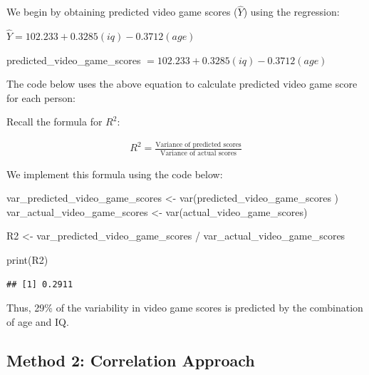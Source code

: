 \documentclass[
]{krantz}
\makeatletter
\newenvironment{Shaded}{\begin{snugshade}}{\end{snugshade}}
\newcommand{\FunctionTok}[1]{\textcolor[rgb]{0,0,0}{#1}}
\newcommand{\NormalTok}[1]{#1}
\newcommand{\OtherTok}[1]{\textcolor[rgb]{0.37,0.37,0.37}{#1}}
\newcommand{\SpecialCharTok}[1]{\textcolor[rgb]{0,0,0}{#1}}
\newenvironment{kframe}{%
\medskip{}
\setlength{\fboxsep}{.8em}
 \def\at@end@of@kframe{}%
 \ifinner\ifhmode%
  \def\at@end@of@kframe{\end{minipage}}%
  \begin{minipage}{\columnwidth}%
 \fi\fi%
 \def\FrameCommand##1{\hskip\@totalleftmargin \hskip-\fboxsep
 \colorbox{shadecolor}{##1}\hskip-\fboxsep
     \hskip-\linewidth \hskip-\@totalleftmargin \hskip\columnwidth}%
 \MakeFramed {\advance\hsize-\width
   \@totalleftmargin\z@ \linewidth\hsize
   \@setminipage}}%
 {\par\unskip\endMakeFramed%
 \at@end@of@kframe}
\renewenvironment{Shaded}{\begin{kframe}}{\end{kframe}}
\makeatother
\begin{document}
We begin by obtaining predicted video game scores (\(\widehat{Y}\)) using the regression:

\(\widehat{Y} = 102.233 + 0.3285(iq) - 0.3712(age)\)

predicted\_video\_game\_scores \(= 102.233 + 0.3285(iq) - 0.3712(age)\)

The code below uses the above equation to calculate predicted video game score for each person:

\begin{Shaded}
\end{Shaded}

Recall the formula for \(R^2\):

\[
\begin{aligned}
R^2 = \frac{\text{Variance of predicted scores}}{\text{Variance of actual scores}}
\end{aligned}
\]

We implement this formula using the code below:

\begin{Shaded}
\begin{Highlighting}[]
\NormalTok{var\_predicted\_video\_game\_scores }\OtherTok{\textless{}{-}} \FunctionTok{var}\NormalTok{(predicted\_video\_game\_scores ) }
\NormalTok{var\_actual\_video\_game\_scores   }\OtherTok{\textless{}{-}}  \FunctionTok{var}\NormalTok{(actual\_video\_game\_scores)}

\NormalTok{R2 }\OtherTok{\textless{}{-}}\NormalTok{ var\_predicted\_video\_game\_scores }\SpecialCharTok{/}\NormalTok{ var\_actual\_video\_game\_scores}

\FunctionTok{print}\NormalTok{(R2)}
\end{Highlighting}
\end{Shaded}

\begin{verbatim}
## [1] 0.2911
\end{verbatim}

Thus, 29\% of the variability in video game scores is predicted by the combination of age and IQ.

\hypertarget{method-2-correlation-approach}{%
\subsection{Method 2: Correlation Approach}\label{method-2-correlation-approach}}
\end{document}
